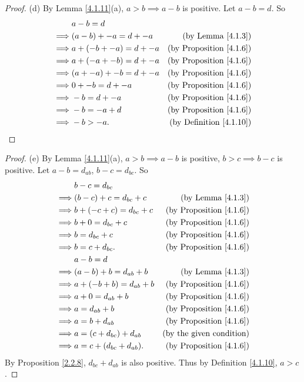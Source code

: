 \begin{proof}{(d)}
By Lemma \ref{4.1.11}(a), \(a > b \implies a - b\) is positive.
Let \(a - b = d\).
So
\begin{align*}
& a - b = d \\
\implies & (a - b) + -a = d + -a & \text{(by Lemma \ref{4.1.3})} \\
\implies & a + (-b + -a) = d + -a & \text{(by Proposition \ref{4.1.6})} \\
\implies & a + (-a + -b) = d + -a & \text{(by Proposition \ref{4.1.6})} \\
\implies & (a + -a) + -b = d + -a & \text{(by Proposition \ref{4.1.6})} \\
\implies & 0 + -b = d + -a & \text{(by Proposition \ref{4.1.6})} \\
\implies & -b = d + -a & \text{(by Proposition \ref{4.1.6})} \\
\implies & -b = -a + d & \text{(by Proposition \ref{4.1.6})} \\
\implies & -b > -a. & \text{(by Definition \ref{4.1.10})}
\end{align*}
\end{proof}

\begin{proof}{(e)}
By Lemma \ref{4.1.11}(a), \(a > b \implies a - b\) is positive, \(b > c \implies b - c\) is positive.
Let \(a - b = d_{ab}\), \(b - c = d_{bc}\).
So
\begin{align*}
& b - c = d_{bc} \\
\implies & (b - c) + c = d_{bc} + c & \text{(by Lemma \ref{4.1.3})} \\
\implies & b + (-c + c) = d_{bc} + c & \text{(by Proposition \ref{4.1.6})} \\
\implies & b + 0 = d_{bc} + c & \text{(by Proposition \ref{4.1.6})} \\
\implies & b = d_{bc} + c & \text{(by Proposition \ref{4.1.6})} \\
\implies & b = c + d_{bc}. & \text{(by Proposition \ref{4.1.6})} \\
& a - b = d \\
\implies & (a - b) + b = d_{ab} + b & \text{(by Lemma \ref{4.1.3})} \\
\implies & a + (-b + b) = d_{ab} + b & \text{(by Proposition \ref{4.1.6})} \\
\implies & a + 0 = d_{ab} + b & \text{(by Proposition \ref{4.1.6})} \\
\implies & a = d_{ab} + b & \text{(by Proposition \ref{4.1.6})} \\
\implies & a = b + d_{ab} & \text{(by Proposition \ref{4.1.6})} \\
\implies & a = (c + d_{bc}) + d_{ab} & \text{(by the given condition)} \\
\implies & a = c + (d_{bc} + d_{ab}). & \text{(by Proposition \ref{4.1.6})} \\
\end{align*}
By Proposition \ref{2.2.8}, \(d_{bc} + d_{ab}\) is also positive.
Thus by Definition \ref{4.1.10}, \(a > c\).
\end{proof}

